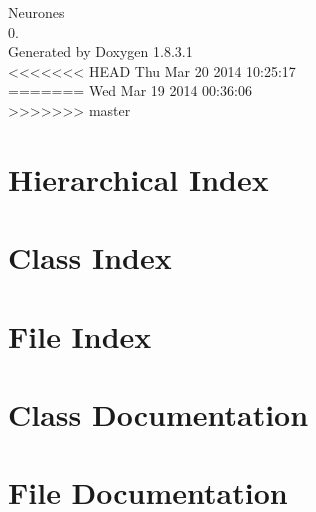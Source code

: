 \documentclass{book}
\begin{document}
\hypersetup{pageanchor=false,citecolor=blue}
\begin{titlepage}
\vspace*{7cm}
\begin{center}
{\Large Neurones \\[1ex]\large 0. }\\
\vspace*{1cm}
{\large Generated by Doxygen 1.8.3.1}\\
\vspace*{0.5cm}
<<<<<<< HEAD
{\small Thu Mar 20 2014 10:25:17}\\
=======
{\small Wed Mar 19 2014 00:36:06}\\
>>>>>>> master
\end{center}
\end{titlepage}
\clearemptydoublepage
{}
\tableofcontents
\clearemptydoublepage
{}
\hypersetup{pageanchor=true,citecolor=blue}
\chapter{Hierarchical Index}

\chapter{Class Index}

\chapter{File Index}

\chapter{Class Documentation}














\chapter{File Documentation}
























\printindex
\end{document}
